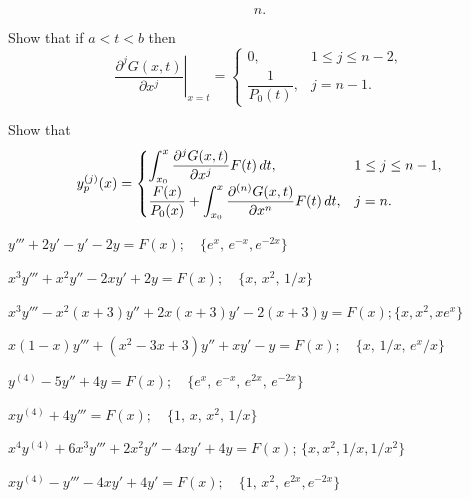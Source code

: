 \begin{exerciselist}
\begin{alist}
\[n.
\]
\item %
Show that if $a<t<b$ then
\[
\left.\frac{\partial^{j}G(x,t)}{\partial x^j}\right|_{x=t}=
\begin{cases}
0,&1\le j\le n-2,\\
\dfrac{1}{P_0(t)},&j=n-1.
\end{cases}
\]
\item %
Show that
\[
y_p^{(j)}(x)=\begin{cases}
\displaystyle\int_{x_0}^x\dfrac{\partial^{j}G(x,t)}{\partial x^j}F(t)\,dt,
&1\le j\le n-1,\\
\displaystyle\dfrac{F(x)}{P_0(x)}+
\int_{x_0}^x\frac{\partial^{(n)}G(x,t)}{\partial x^n}F(t)\,dt,
&j=n.
\end{cases}
\]
\end{alist}



\item\label{exer:9.4.35}$y'''+2y'-y'-2y=F(x); \quad \{e^x,\,e^{-x},e^{-2x}\}$

\item\label{exer:9.4.36}$x^3y'''+x^2y''-2xy'+2y=F(x); \quad \{x,\,x^2,\,1/x\}$

\item\label{exer:9.4.37}$x^3y'''-x^2(x+3)y''+2x(x+3)y'-2(x+3)y=F(x); \{x,x^2,xe^x\}$

\item\label{exer:9.4.38}$x(1-x)y'''+(x^2-3x+3)y''+xy'-y=F(x); \quad \{x,\,1/x,\,e^x/x\}$

\item\label{exer:9.4.39}$y^{(4)}-5y''+4y=F(x); \quad \{e^x,\,e^{-x},\,e^{2x},\,e^{-2x}\}$

\item\label{exer:9.4.40}$xy^{(4)}+4y'''=F(x); \quad  \{1,\,x,\,x^2,\,1/x\}$

\item\label{exer:9.4.41}$x^4y^{(4)}+6x^3y'''+2x^2y''-4xy'+4y=F(x)$;\quad
$\{x,x^2,1/x,1/x^2\}$

\item\label{exer:9.4.42}$xy^{(4)}-y'''-4xy'+4y'=F(x); \quad \{1,\,x^2,\,e^{2x}, e^{-2x}\}$

\end{exerciselist}
